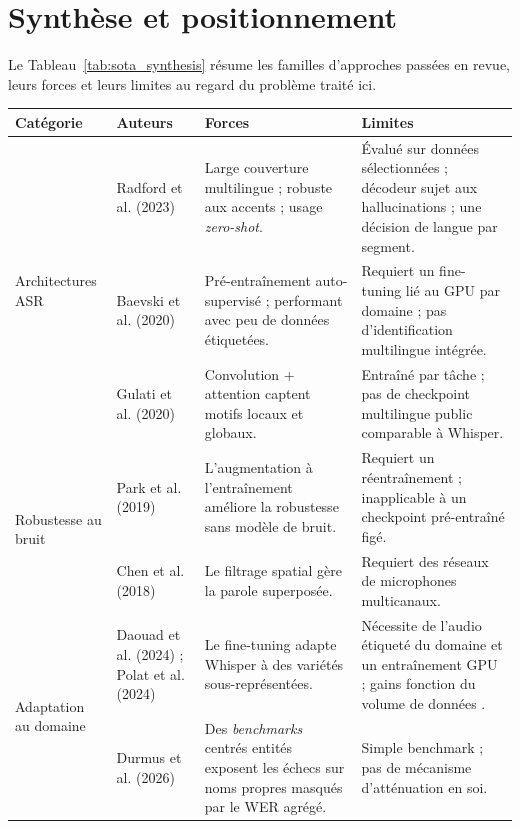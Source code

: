 \documentclass[12pt]{report}
\begin{document}
\section{Synthèse et positionnement}
Le Tableau~\ref{tab:sota_synthesis} résume les familles d'approches passées en revue, leurs forces et leurs limites au regard du problème traité ici.
\begin{table}[htbp]
\centering
\footnotesize
\renewcommand{\arraystretch}{1.2}
\begin{tabular}{|p{2.2cm}|p{2.8cm}|p{4.4cm}|p{4.6cm}|}
\hline
\textbf{Catégorie} & \textbf{Auteurs} & \textbf{Forces} & \textbf{Limites} \\ \hline
\multirow{3}{2.2cm}{Architectures ASR}
& Radford et al. (2023) \cite{radford2023robust}
& Large couverture multilingue ; robuste aux accents ; usage \textit{zero-shot}.
& Évalué sur données sélectionnées ; décodeur sujet aux hallucinations ; une décision de langue par segment. \\ \cline{2-4}
& Baevski et al. (2020) \cite{baevski2020wav2vec}
& Pré-entraînement auto-supervisé ; performant avec peu de données étiquetées.
& Requiert un fine-tuning lié au GPU par domaine ; pas d'identification multilingue intégrée. \\ \cline{2-4}
& Gulati et al. (2020) \cite{gulati2020conformer}
& Convolution + attention captent motifs locaux et globaux.
& Entraîné par tâche ; pas de checkpoint multilingue public comparable à Whisper. \\ \hline
\multirow{2}{2.2cm}{Robustesse au bruit}
& Park et al. (2019) \cite{park2019specaugment}
& L'augmentation à l'entraînement améliore la robustesse sans modèle de bruit.
& Requiert un réentraînement ; inapplicable à un checkpoint pré-entraîné figé. \\ \cline{2-4}
& Chen et al. (2018) \cite{chen2018multi}
& Le filtrage spatial gère la parole superposée.
& Requiert des réseaux de microphones multicanaux. \\ \hline
\multirow{2}{2.2cm}{Adaptation au domaine}
& Daouad et al. (2024) \cite{daouad2024optimizing} ; Polat et al. (2024) \cite{polat2024implementation}
& Le fine-tuning adapte Whisper à des variétés sous-représentées.
& Nécessite de l'audio étiqueté du domaine et un entraînement GPU ; gains fonction du volume de données \cite{whisperfinetune2024}. \\ \cline{2-4}
& Durmus et al. (2026) \cite{durmus2026contextual}
& Des \textit{benchmarks} centrés entités exposent les échecs sur noms propres masqués par le WER agrégé.
& Simple benchmark ; pas de mécanisme d'atténuation en soi. \\ \hline

\end{tabular}
\end{table}
\end{document}
